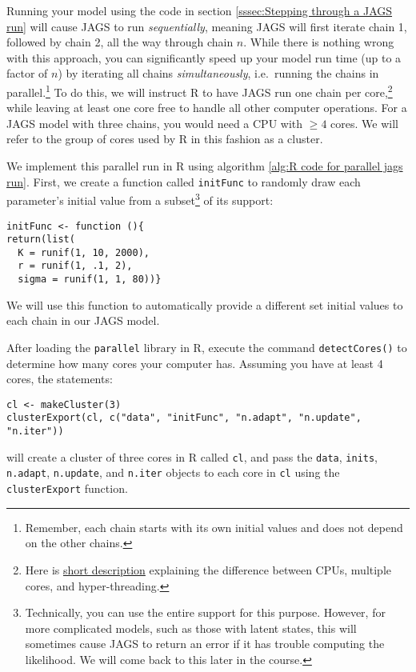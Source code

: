\documentclass[12pt,english]{article}
\begin{document}
Running your model using the code in section \ref{sssec:Stepping through a JAGS run} will cause JAGS to run \emph{sequentially}, meaning JAGS will first iterate chain 1, followed by chain 2, all the way through chain $n$. While there is nothing wrong with this approach, you can significantly speed up your model run time (up to a factor of $n$) by iterating all chains \emph{simultaneously}, i.e.\ running the chains in parallel.\footnote{Remember, each chain starts with its own initial values and does not depend on the other chains.} To do this, we will instruct R to have JAGS run one chain per core,\footnote{Here is \href{http://www.howtogeek.com/194756/cpu-basics-multiple-cpus-cores-and-hyper-threading-explained/}{short description} explaining the difference between CPUs, multiple cores, and hyper-threading.} while leaving at least one core free to handle all other computer operations. For a JAGS model with three chains, you would need a CPU with $\geq 4$ cores. We will refer to the group of cores used by R in this fashion as a cluster.

We implement this parallel run in R using algorithm \ref{alg:R code for parallel jags run}. First, we create a function called \texttt{initFunc} to randomly draw each parameter's initial value from a subset\footnote{Technically, you can use the entire support for this purpose. However, for more complicated models, such as those with latent states, this will sometimes cause JAGS to return an error if it has trouble computing the likelihood. We will come back to this later in the course.} of its support:

\begin{Verbatim}
initFunc <- function (){
return(list(
  K = runif(1, 10, 2000),
  r = runif(1, .1, 2),
  sigma = runif(1, 1, 80))}
\end{Verbatim}

\noindent We will use this function to automatically provide a different set initial values to each chain in our JAGS model.

After loading the \texttt{parallel} library in R, execute the command \texttt{detectCores()} to determine how many cores your computer has. Assuming you have at least 4 cores, the statements:

\begin{Verbatim}
cl <- makeCluster(3)
clusterExport(cl, c("data", "initFunc", "n.adapt", "n.update", "n.iter")) 
\end{Verbatim}

\noindent will create a cluster of three cores in R called \texttt{cl}, and pass the \texttt{data}, \texttt{inits}, \texttt{n.adapt}, \texttt{n.update}, and \texttt{n.iter} objects to each core in \texttt{cl} using the \texttt{clusterExport} function. 
\end{document}
